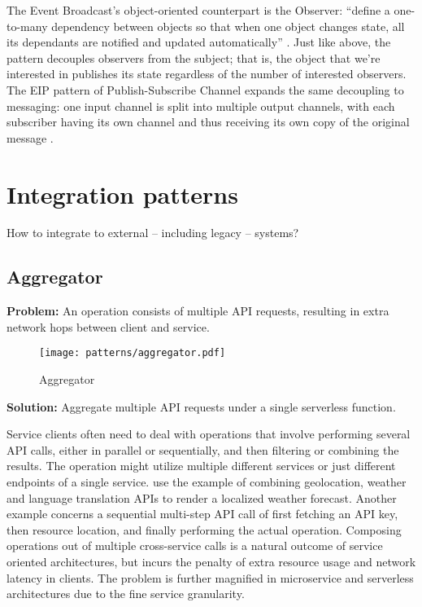 The Event Broadcast's object-oriented counterpart is the Observer: ``define a one-to-many dependency between objects so that when one object changes state, all its dependants are notified and updated automatically'' \parencite{gamma94designPatterns}. Just like above, the pattern decouples observers from the subject; that is, the object that we're interested in publishes its state regardless of the number of interested observers. The EIP pattern of Publish-Subscribe Channel expands the same decoupling to messaging: one input channel is split into multiple output channels, with each subscriber having its own channel and thus receiving its own copy of the original message \parencite{hohpe2004enterprise}.

\section{Integration patterns} \label{sec:integrationPatterns}

How to integrate to external -- including legacy -- systems?

\subsection{Aggregator} \label{subsec:aggregator}

\textbf{Problem:} An operation consists of multiple API requests, resulting in extra network hops between client and service.

\begin{figure}[h]
  \centering
  \texttt{[image: patterns/aggregator.pdf]}
  \caption{Aggregator}
  \label{fig:aggregator}
\end{figure}

\textbf{Solution:} Aggregate multiple API requests under a single serverless function.

Service clients often need to deal with operations that involve performing several API calls, either in parallel or sequentially, and then filtering or combining the results. The operation might utilize multiple different services or just different endpoints of a single service. \textcite{baldini17currentTrends} use the example of combining geolocation, weather and language translation APIs to render a localized weather forecast. Another example concerns a sequential multi-step API call of first fetching an API key, then resource location, and finally performing the actual operation. Composing operations out of multiple cross-service calls is a natural outcome of service oriented architectures, but incurs the penalty of extra resource usage and network latency in clients. The problem is further magnified in microservice and serverless architectures due to the fine service granularity. \parencite{microsoft18cloudPatterns}

